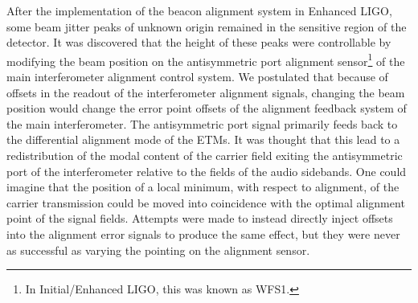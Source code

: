 After the implementation of the beacon alignment system in Enhanced LIGO, some beam jitter peaks of unknown origin remained in the sensitive region of the detector. %
It was discovered that the height of these peaks were controllable by modifying the beam position on the antisymmetric port alignment sensor\footnote{In Initial/Enhanced LIGO, this was known as WFS1.} of the main interferometer alignment control system. %
We postulated that because of offsets in the readout of the interferometer alignment signals, changing the beam position would change the error point offsets of the alignment feedback system of the main interferometer. %
The antisymmetric port signal primarily feeds back to the differential alignment mode of the ETMs. %
It was thought that this lead to a redistribution of the modal content of the carrier field exiting the antisymmetric port of the interferometer relative to the fields of the audio sidebands. %
One could imagine that the position of a local minimum, with respect to alignment, of the carrier transmission could be moved into coincidence with the optimal alignment point of the signal fields. %
Attempts were made to instead directly inject offsets into the alignment error signals to produce the same effect, but they were never as successful as varying the pointing on the alignment sensor.
